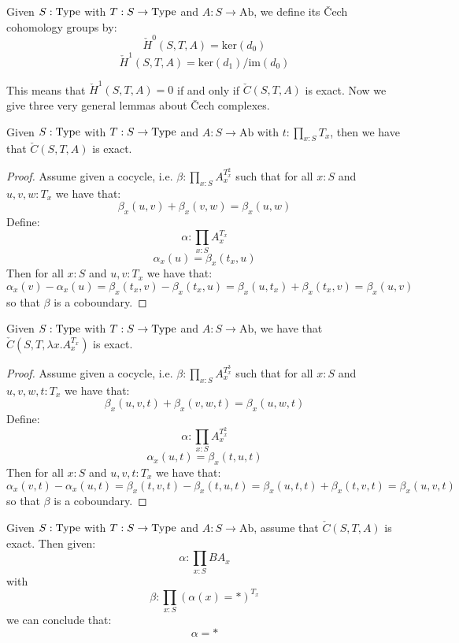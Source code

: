 \begin{definition}
Given $S:\mathrm{Type}$ with $T:S\to \mathrm{Type}$ and $A:S\to\mathrm{Ab}$, we define its \v{C}ech cohomology groups by:
\[\check{H}^0(S,T,A) = \mathrm{ker}(d_0)\]
\[\check{H}^1(S,T,A) = \mathrm{ker}(d_1)/\mathrm{im}(d_0)\]
\end{definition}

This means that $\check{H}^1(S,T,A) = 0$ if and only if $\check{C}(S,T,A)$ is exact. Now we give three very general lemmas about \v{C}ech complexes.

\begin{lemma}\label{section-exact-cech-complex}
Given $S:\mathrm{Type}$ with $T:S\to \mathrm{Type}$ and $A:S\to\mathrm{Ab}$ with $t:\prod_{x:S}T_x$, then we have that $\check{C}(S,T,A)$ is exact.
\end{lemma}

\begin{proof}
Assume given a cocycle, i.e. $\beta:\prod_{x:S}A_x^{T_x^2}$ such that for all $x:S$ and $u,v,w:T_x$ we have that:
\[\beta_x(u,v)+\beta_x(v,w) = \beta_x(u,w)\]
Define:
\[\alpha:\prod_{x:S}A_x^{T_x}\]
\[\alpha_x(u) = \beta_x(t_x,u)\]
Then for all $x:S$ and $u,v:T_x$ we have that:
\[\alpha_x(v)-\alpha_x(u) = \beta_x(t_x,v) - \beta_x(t_x,u) = \beta_x(u,t_x)+\beta_x(t_x,v) = \beta_x(u,v)\]
so that $\beta$ is a coboundary.
\end{proof}

\begin{lemma}\label{canonical-exact-cech-complex}
Given $S:\mathrm{Type}$ with $T:S\to \mathrm{Type}$ and $A:S\to\mathrm{Ab}$, we have that $\check{C}(S,T,\lambda x.A_x^{T_x})$ is exact.
\end{lemma}

\begin{proof}
Assume given a cocycle, i.e. $\beta:\prod_{x:S}A_x^{T_x^3}$ such that for all $x:S$ and $u,v,w,t:T_x$ we have that:
\[\beta_x(u,v,t)+\beta_x(v,w,t) = \beta_x(u,w,t)\]
Define:
\[\alpha:\prod_{x:S}A_x^{T_x^2}\]
\[\alpha_x(u,t) = \beta_x(t,u,t)\]
Then for all $x:S$ and $u,v,t:T_x$ we have that:
\[\alpha_x(v,t)-\alpha_x(u,t) = \beta_x(t,v,t) - \beta_x(t,u,t) = \beta_x(u,t,t)+\beta_x(t,v,t) = \beta_x(u,v,t)\]
so that $\beta$ is a coboundary.
\end{proof}

\begin{lemma}\label{exact-cech-complex-vanishing-cohomology}
Given $S:\mathrm{Type}$ with $T:S\to \mathrm{Type}$ and $A:S\to\mathrm{Ab}$, assume that $\check{C}(S,T,A)$ is exact. Then given:
\[\alpha:\prod_{x:S}BA_x\]
with
\[\beta: \prod_{x:S} (\alpha(x) = *)^{T_x}\]
we can conclude that:
\[\alpha = *\]
\end{lemma}

